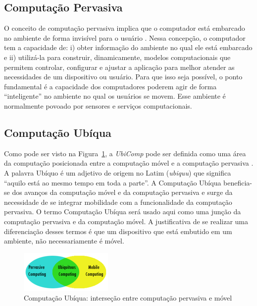\subsection{Computação Pervasiva}\label{sec:comp-prevasiva}
O conceito de computação pervasiva implica que o computador está embarcado no ambiente de forma invisível para o usuário \cite{krumm2009}. Nessa concepção, o computador tem a capacidade de: i) obter informação do ambiente no qual ele está embarcado e ii) utilizá-la para construir, dinamicamente, modelos computacionais que permitem controlar, configurar e ajustar a aplicação para melhor atender as necessidades de um dispositivo ou usuário. Para que isso seja possível, o ponto fundamental é a capacidade dos computadores poderem agir de forma “inteligente” no ambiente no qual os usuários se movem. Esse ambiente é normalmente povoado por sensores e serviços computacionais. 

\subsection{Computação Ubíqua}\label{sec:comp-ubiqua}
Como pode ser visto na Figura~\ref{fig:ubiq}, a \textit{UbiComp} pode ser definida como uma área da computação posicionada entre a computação móvel e a computação pervasiva \cite{krumm2009,de2003computaccao}. A palavra Ubíquo é um adjetivo de origem no Latim (\textit{ubiquu}) que significa “aquilo está ao mesmo tempo em toda a parte”. A Computação Ubíqua beneficia-se dos avanços da computação móvel e da computação pervasiva e surge da necessidade de se integrar mobilidade com a funcionalidade da computação pervasiva. O termo Computação Ubíqua será usado aqui como uma junção da computação pervasiva e da computação móvel. A justificativa de se realizar uma diferenciação desses termos é que um dispositivo que está embutido em um ambiente, não necessariamente é móvel. 

\begin{figure}[h]
\centering
    \includegraphics[width=0.4\textwidth,natwidth=610,natheight=642]{images/ubiq.png}
    \caption{Computação Ubíqua: interseção entre computação pervasiva e móvel}
    \label{fig:ubiq}
\end{figure}
				

